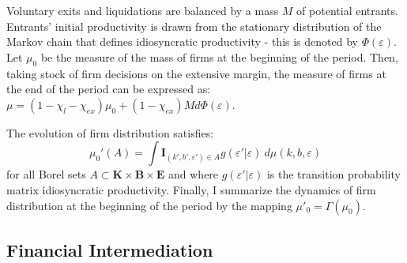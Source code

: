 \documentclass[12pt]{article}
\begin{document}
Voluntary exits and liquidations are balanced by a mass $M$ of potential entrants. Entrants' initial productivity is drawn from the stationary distribution of the Markov chain that defines idiosyncratic productivity - this is denoted by $\Phi(\varepsilon)$. Let $\mu_0$ be the measure of the mass of firms at the beginning of the period. Then, taking stock of firm decisions on the extensive margin, the measure of firms at the end of the period can be expressed as: $\mu = (1 - \chi_l - \chi_{ex}) \mu_0 + (1 - \chi_{ex}) M d \Phi(\varepsilon) $. 

The evolution of firm distribution satisfies: 
\begin{equation} \label{eq_firmdim} 
	\mu_{0}'(A) = \int \mathbf{I}_{(k', b', \varepsilon') \in A} g(\varepsilon'|\varepsilon) \ d \mu (k,b,\varepsilon)
\end{equation}
for all Borel sets $A \subset \mathbf{K} \times \mathbf{B} \times \mathbf{E} $ and where $g(\varepsilon'|\varepsilon)$ is the transition probability matrix idiosyncratic productivity. Finally, I summarize the dynamics of firm distribution at the beginning of the period by the mapping $ \mu'_0 =\Gamma(\mu_0)$.


\subsection{Financial Intermediation}  \label{sec: Financial Intermediation}
\end{document}
